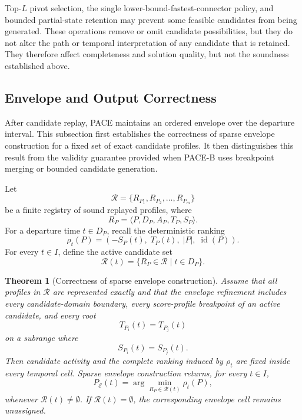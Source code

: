\documentclass[a4paper,fleqn]{cas-dc}
\newtheorem{theorem}{Theorem}
\begin{document}
Top-\(L\) pivot selection, the single lower-bound-fastest-connector policy, and bounded
partial-state retention may prevent some feasible candidates from being
generated. These operations remove or omit candidate possibilities, but they
do not alter the path or temporal interpretation of any candidate that is
retained. They therefore affect completeness and solution quality, but not the
soundness established above.

\subsection{Envelope and Output Correctness}
\label{subsec:analysis_envelope}

After candidate replay, PACE maintains an ordered envelope over the departure
interval. This subsection first establishes the correctness of sparse envelope
construction for a fixed set of exact candidate profiles. It then distinguishes
this result from the validity guarantee provided when PACE-B uses breakpoint
merging or bounded candidate generation.

Let
\[
\mathcal{R}
=
\{R_{P_1},R_{P_2},\ldots,R_{P_m}\}
\]
be a finite registry of sound replayed profiles, where
\[
R_P=\langle P,D_P,A_P,T_P,S_P\rangle.
\]
For a departure time \(t\in D_P\), recall the deterministic ranking
\[
\rho_t(P)
=
\left(
-S_P(t),\;
T_P(t),\;
|P|,\;
\operatorname{id}(P)
\right).
\]
For every \(t\in I\), define the active candidate set
\[
\mathcal{R}(t)
=
\{R_P\in\mathcal{R}\mid t\in D_P\}.
\]

\begin{theorem}[Correctness of sparse envelope construction]
\label{thm:envelope_correctness}
Assume that all profiles in \(\mathcal{R}\) are represented exactly and that
the envelope refinement includes every candidate-domain boundary, every
score-profile breakpoint of an active candidate, and every root
\[
T_{P_i}(t)=T_{P_j}(t)
\]
on a subrange where
\[
S_{P_i}(t)=S_{P_j}(t).
\]
Then candidate activity and the complete ranking induced by \(\rho_t\) are
fixed inside every temporal cell. Sparse envelope construction returns, for
every \(t\in I\),
\[
P_{\mathcal{E}}(t)
=
\arg\min_{R_P\in\mathcal{R}(t)}
\rho_t(P),
\]
whenever \(\mathcal{R}(t)\neq\emptyset\). If
\(\mathcal{R}(t)=\emptyset\), the corresponding envelope cell remains
unassigned.
\end{theorem}
\end{document}
